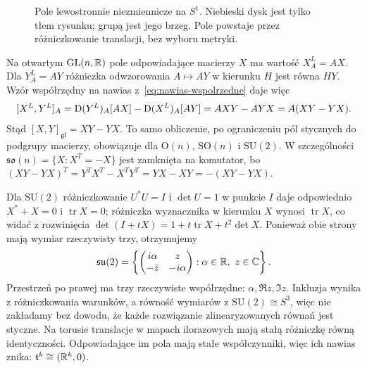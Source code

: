 \begin{figure}[!htbp]
\centering
{}
\caption{Pole lewostronnie niezmiennicze na $S^1$.
Niebieski dysk jest tylko tłem rysunku; grupą jest jego brzeg.
Pole powstaje przez różniczkowanie translacji, bez wyboru metryki.}
\label{fig:lie-pole-okrag}
\end{figure}

\begin{przyklad}
\label{prz:lie-bracket-matrix}
Na otwartym $\mathrm{GL}(n,\mathbb{R})$ pole odpowiadające macierzy
$X$ ma wartość $X^L_A=AX$. Dla $Y^L_A=AY$ różniczka
odwzorowania $A\mapsto AY$ w kierunku $H$ jest równa $HY$.
Wzór współrzędny na nawias z~\eqref{eq:nawias-wspolrzedne}
daje więc
\[
 [X^L,Y^L]_A
 =\mathrm D(Y^L)_A[AX]-\mathrm D(X^L)_A[AY]
 =AXY-AYX=A(XY-YX).
\]
Stąd $[X,Y]_{\mathfrak{gl}}=XY-YX$. To samo obliczenie,
po ograniczeniu pól stycznych do podgrupy macierzy, obowiązuje
dla $\mathrm O(n)$, $\mathrm{SO}(n)$ i $\mathrm{SU}(2)$.
W szczególności
$\mathfrak{so}(n)=\{X:X^T=-X\}$ jest zamknięta na komutator,
bo $(XY-YX)^T=Y^TX^T-X^TY^T=YX-XY=-(XY-YX)$.

Dla $\mathrm{SU}(2)$ różniczkowanie $U^*U=I$ i $\det U=1$
w punkcie $I$ daje odpowiednio $X^*+X=0$ i
$\operatorname{tr}X=0$; różniczka wyznacznika w kierunku
$X$ wynosi $\operatorname{tr}X$, co widać z rozwinięcia
$\det(I+tX)=1+t\operatorname{tr}X+t^2\det X$.
Ponieważ obie strony mają wymiar
rzeczywisty trzy, otrzymujemy
\[
 \mathfrak{su}(2)
 =\left\{\begin{pmatrix}i\alpha&z\\-\bar z&-i\alpha\end{pmatrix}
 :\alpha\in\mathbb{R},\ z\in\mathbb{C}\right\}.
\]
Przestrzeń po prawej ma trzy rzeczywiste współrzędne:
$\alpha,\Re z,\Im z$. Inkluzja wynika z różniczkowania warunków,
a równość wymiarów z $\mathrm{SU}(2)\cong S^3$,
więc nie zakładamy bez dowodu, że każde rozwiązanie
zlinearyzowanych równań jest styczne.
Na torusie translacje w mapach ilorazowych mają stałą
różniczkę równą identyczności. Odpowiadające im pola mają
stałe współczynniki, więc ich nawias znika:
$\mathfrak t^k\cong(\mathbb{R}^k,0)$.
\end{przyklad}

